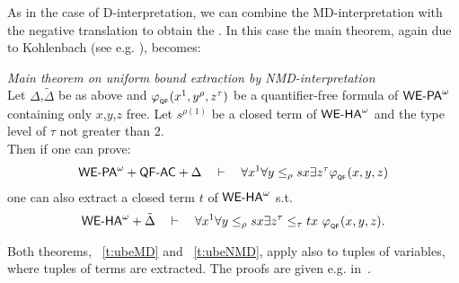 As in the case of D-interpretation, we can combine the MD-interpretation with
the negative translation to obtain the . In this case
the main theorem, again due to Kohlenbach (see e.g. \cite{Kohlenbach08}), becomes:
\begin{thm}{\em Main theorem on uniform bound extraction by NMD-interpretation \cite{Kohlenbach08}\\}
\label{t:ubeNMD}
Let $\Delta$,$\tilde\Delta$ be as above and $\varphi_{{}_{\textsf{\upshape QF}}}(x^1,y^\rho,z^\tau)$ be a 
quantifier-free formula of ${\textsf{\upshape WE-PA}}^{\omega}$ containing only $x$,$y$,$z$ free. 
Let $s^{\rho(1)}$ be a closed
term of ${\textsf{\upshape WE-HA}}^{\omega}$ and the type level of $\tau$ not greater than $2$.\\
Then if one can prove:
\[
{\textsf{\upshape WE-PA}}^{\omega}+\textsf{\upshape QF-}\textsf{\upshape AC}+\Delta\quad\vdash\quad
  \forall x^1\forall y\leq_\rho sx\exists z^\tau \varphi_{{}_{\textsf{\upshape QF}}}(x,y,z)
\]
one can also extract a closed term $t$ of ${\textsf{\upshape WE-HA}}^{\omega}$ s.t.
\[
\weha+\tilde\Delta\quad\proves\quad
  \forall x^1\forall y\leq_\rho sx\exists z^\tau\leq_\tau tx\ \phi_{{}_{\QF}}(x,y,z)\text{.}
\]
\end{thm}
Both theorems, ~\ref{t:ubeMD} and ~\ref{t:ubeNMD}, apply also to tuples of variables, 
where tuples of terms are extracted. The proofs are given e.g. in~\cite{Kohlenbach08}.
%
%
%
%
